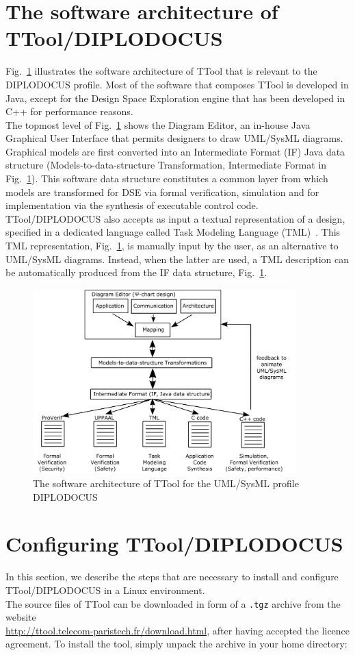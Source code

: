 \documentclass{llncs}
\begin{document}
\section{The software architecture of TTool/DIPLODOCUS}
\label{sec:SwArch}
%
Fig.~\ref{fig:TToolSWArch} illustrates the software architecture of TTool that is relevant to the DIPLODOCUS profile.
Most of the software that composes TTool is developed in Java, except for the Design Space Exploration engine that has
been developed in C++ for performance reasons.\\
%
The topmost level of Fig.~\ref{fig:TToolSWArch} shows the Diagram Editor, an in-house Java Graphical User
Interface that permits designers to draw UML/SysML diagrams. Graphical models are first converted into an Intermediate
Format (IF) Java data structure (Models-to-data-structure Transformation, Intermediate Format in
Fig.~\ref{fig:TToolSWArch}). This software data structure constitutes a common layer from which models are transformed
for DSE via formal verification, simulation and for implementation via the synthesis of executable control code.\\
%
TTool/DIPLODOCUS also accepts as input a textual representation of a design, specified in a dedicated language called
Task Modeling Language (TML)~\cite{Waseem06}. This TML representation, Fig.~\ref{fig:TToolSWArch}, is manually input by
the user, as an alternative to UML/SysML diagrams. Instead, when the latter are used, a TML description can be
automatically produced from the IF data structure, Fig.~\ref{fig:TToolSWArch}.
%
\begin{figure}[!htbp]
	\centering
	\includegraphics[width=4in]{figures/TToolSWArch.pdf}
	\caption{The software architecture of TTool for the UML/SysML profile DIPLODOCUS}
	\label{fig:TToolSWArch}
\end{figure}
%
%
%
\section{Configuring TTool/DIPLODOCUS}
\label{sec:Config}
%
In this section, we describe the steps that are necessary to install and configure TTool/DIPLODOCUS in a Linux
environment.\\
%
The source files of TTool can be downloaded in form of a \texttt{.tgz} archive from the website\\
\url{http://ttool.telecom-paristech.fr/download.html}, after having accepted the
licence agreement. To install the tool, simply unpack the archive in your home directory:\\
%
\end{document}

